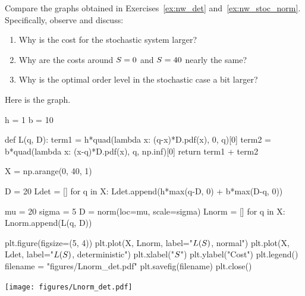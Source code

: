 \begin{exercise}[Continuation]
Compare  the graphs obtained in Exercises~\ref{ex:nw_det} and~\ref{ex:nw_stoc_norm}. 
Specifically, observe and discuss:
\begin{enumerate}
\item Why is the  cost for the stochastic system larger?
\item Why are the costs around $S=0$ and $S=40$ nearly the same? 
\item Why is the optimal order level in the stochastic case a bit larger?
\end{enumerate}
\begin{solution}
Here is the graph.

\begin{pycode}[news]
h = 1
b = 10

def L(q, D):
    term1 = h*quad(lambda x: (q-x)*D.pdf(x), 0, q)[0]
    term2 = b*quad(lambda x: (x-q)*D.pdf(x), q, np.inf)[0]
    return term1 + term2

X = np.arange(0, 40, 1)

D = 20
Ldet = []
for q in X:
    Ldet.append(h*max(q-D, 0) + b*max(D-q, 0))

mu = 20
sigma = 5 
D = norm(loc=mu, scale=sigma) 
Lnorm = []
for q in X:
    Lnorm.append(L(q, D))

plt.figure(figsize=(5, 4))
plt.plot(X, Lnorm, label="$L(S)$, normal")
plt.plot(X, Ldet, label="$L(S)$, deterministic")
plt.xlabel("$S$")
plt.ylabel("Cost")
plt.legend()
filename = "figures/Lnorm_det.pdf"
plt.savefig(filename)
plt.close()
\end{pycode}

\begin{center}
\texttt{[image: figures/Lnorm\_det.pdf]}
\end{center}


\end{solution}
\end{exercise}

